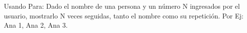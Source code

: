 ﻿
Usando Para: Dado el nombre de una persona y un número N ingresados por el usuario, mostrarlo N veces seguidas, tanto el nombre como su repetición. Por Ej: Ana 1, Ana 2, Ana 3.


\newpage
{}

\volverindice
\newpage
